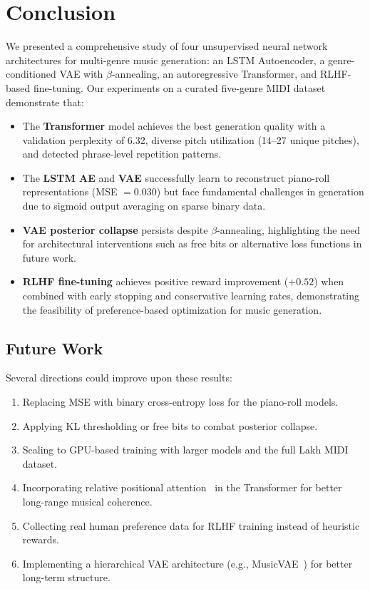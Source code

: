 \documentclass[conference]{IEEEtran}
\begin{document}
\section{Conclusion}

We presented a comprehensive study of four unsupervised neural network architectures for multi-genre music generation: an LSTM Autoencoder, a genre-conditioned VAE with $\beta$-annealing, an autoregressive Transformer, and RLHF-based fine-tuning. Our experiments on a curated five-genre MIDI dataset demonstrate that:

\begin{itemize}
    \item The \textbf{Transformer} model achieves the best generation quality with a validation perplexity of 6.32, diverse pitch utilization (14--27 unique pitches), and detected phrase-level repetition patterns.
    \item The \textbf{LSTM AE} and \textbf{VAE} successfully learn to reconstruct piano-roll representations (MSE $= 0.030$) but face fundamental challenges in generation due to sigmoid output averaging on sparse binary data.
    \item \textbf{VAE posterior collapse} persists despite $\beta$-annealing, highlighting the need for architectural interventions such as free bits or alternative loss functions in future work.
    \item \textbf{RLHF fine-tuning} achieves positive reward improvement ($+0.52$) when combined with early stopping and conservative learning rates, demonstrating the feasibility of preference-based optimization for music generation.
\end{itemize}

\subsection{Future Work}

Several directions could improve upon these results:
\begin{enumerate}
    \item Replacing MSE with binary cross-entropy loss for the piano-roll models.
    \item Applying KL thresholding or free bits to combat posterior collapse.
    \item Scaling to GPU-based training with larger models and the full Lakh MIDI dataset.
    \item Incorporating relative positional attention~\cite{huang2019music} in the Transformer for better long-range musical coherence.
    \item Collecting real human preference data for RLHF training instead of heuristic rewards.
    \item Implementing a hierarchical VAE architecture (e.g., MusicVAE~\cite{roberts2018hierarchical}) for better long-term structure.
\end{enumerate}
\end{document}
